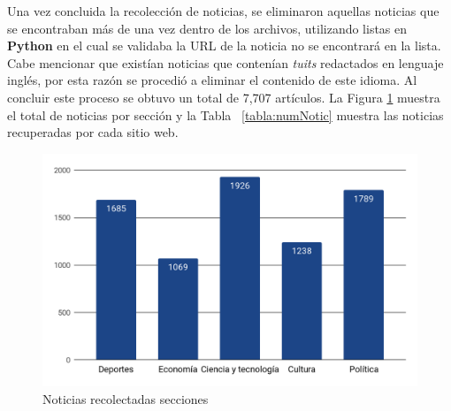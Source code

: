 Una vez concluida la recolección de noticias, se eliminaron aquellas noticias que se encontraban más de una vez dentro de los archivos, utilizando listas en \textbf{Python} en el cual se validaba la URL de la noticia no se encontrará en la lista. Cabe mencionar que existían noticias que contenían \textit{tuits} redactados en lenguaje inglés, por esta razón se procedió a eliminar el contenido de este idioma. Al concluir este proceso se obtuvo un total de 7,707 artículos. La Figura  \ref{fig:cp5:secciones} muestra el total de noticias por sección y la Tabla \ \ref{tabla:numNotic} muestra las noticias recuperadas por cada sitio web.




\begin{figure}[h]
  \centering
  \includegraphics[scale=.28]{imagenes/Capitulo5/seccionesCr.png}
  \caption{Noticias recolectadas secciones}
  \label{fig:cp5:secciones}
\end{figure}


%
%

